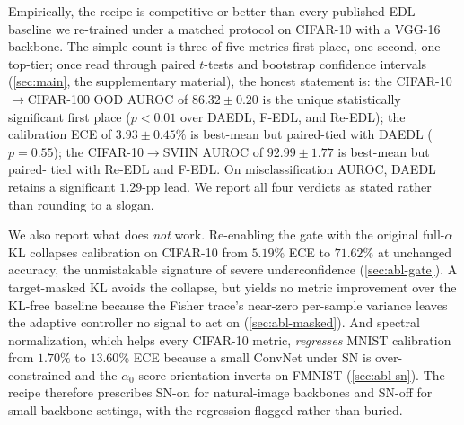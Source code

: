 \documentclass[review,5p,times]{elsarticle}
\begin{document}
Empirically, the recipe is competitive or better than every published EDL
baseline we re-trained under a matched protocol on CIFAR-10 with a VGG-16
backbone. The simple count is three of five metrics first place, one
second, one top-tier; once read through paired $t$-tests and bootstrap
confidence intervals (\autoref{sec:main}, the supplementary material),
the honest statement is: the CIFAR-10$\to$CIFAR-100 OOD AUROC of
$86.32\!\pm\!0.20$ is the unique statistically significant first place
($p\!<\!0.01$ over DAEDL, F-EDL, and Re-EDL); the calibration ECE of
$3.93\!\pm\!0.45\%$ is best-mean but paired-tied with DAEDL ($p\!=\!0.55$);
the CIFAR-10$\to$SVHN AUROC of $92.99\!\pm\!1.77$ is best-mean but paired-
tied with Re-EDL and F-EDL. On misclassification AUROC, DAEDL retains a
significant $1.29$-pp lead. We report all four verdicts as stated rather
than rounding to a slogan.

We also report what does \emph{not} work. Re-enabling the gate with the
original full-$\alpha$ KL collapses calibration on CIFAR-10 from
$5.19\%$ ECE to $71.62\%$ at unchanged accuracy, the unmistakable
signature of severe underconfidence
(\autoref{sec:abl-gate}). A target-masked KL avoids the collapse, but
yields no metric improvement over the KL-free baseline because the
Fisher trace's near-zero per-sample variance leaves the adaptive
controller no signal to act on (\autoref{sec:abl-masked}). And spectral
normalization, which helps every CIFAR-10 metric, \emph{regresses} MNIST
calibration from $1.70\%$ to $13.60\%$ ECE because a small ConvNet under
SN is over-constrained and the $\alpha_0$ score orientation inverts on
FMNIST (\autoref{sec:abl-sn}). The recipe therefore prescribes SN-on for
natural-image backbones and SN-off for small-backbone settings, with the
regression flagged rather than buried.
\end{document}
